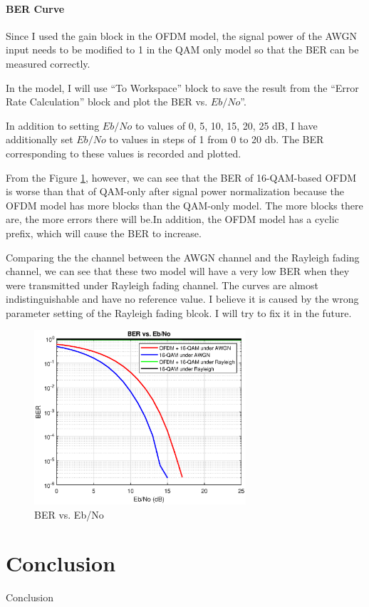 \documentclass[10pt]{article}
\numberwithin{figure}{section}
\numberwithin{equation}{section}
\begin{document}
\subsection{BER Curve}
Since I used the gain block in the OFDM model, the signal power of the AWGN input needs to be modified to 1 in the QAM only model so that the BER can be measured correctly.

In the model, I will use ``To Workspace'' block to save the result from the ``Error Rate Calculation'' block and plot the BER vs. $Eb/No$''.

In addition to setting $Eb/No$ to values of 0, 5, 10, 15, 20, 25 dB, I have additionally set $Eb/No$ to values in steps of 1 from 0 to 20 db. The BER corresponding to these values is recorded and plotted.

From the Figure \ref{fig:BER}, however, we can see that the BER of 16-QAM-based OFDM is worse than that of QAM-only after signal power normalization because the OFDM model has more blocks than the QAM-only model. The more blocks there are, the more errors there will be.In addition, the OFDM model has a cyclic prefix, which will cause the BER to increase. 

Comparing the the channel between the AWGN channel and the Rayleigh fading channel, we can see that these two model will have a very low BER when they were transmitted under Rayleigh fading channel. The curves are almost indistinguishable and have no reference value. I believe it is caused by the wrong parameter setting of the Rayleigh fading blcok. I will try to fix it in the future.
\begin{figure}[!h]
    \centering
    \includegraphics[width=0.7\textwidth]{images/BER.eps}
    \caption{BER vs. Eb/No}
    \label{fig:BER}
\end{figure}

\part{Conclusion}
Conclusion


\pagebreak


\end{document}

